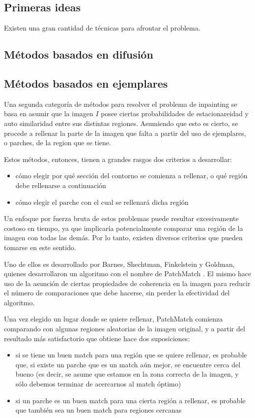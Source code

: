 \documentclass[assd_tpf_main.tex]{subfiles}
\begin{document}
\subsection{Primeras ideas}
Existen una gran cantidad de técnicas para afrontar el problema.


\subsection{Métodos basados en difusión}





\subsection{Métodos basados en ejemplares}
Una segunda categor\'ia de m\'etodos para resolver el problema de inpainting se basa en 
asumir que la imagen $I$ posee ciertas probabilidades de estacionareidad y auto similaridad 
entre sus distintas regiones. Asumiendo que esto es cierto, se procede a rellenar la parte
de la imagen que falta a partir del uso de ejemplares, o parches, de la region que se tiene.

Estos m\'etodos, entonces, tienen a grandes rasgos dos criterios a desarrollar:
\begin{itemize}
	\item c\'omo elegir por qu\'e secci\'on del contorno se comienza a rellenar, o qu\'e
	regi\'on debe rellenarse a continuaci\'on
	\item c\'omo elegir el parche con el cual se rellenar\'a dicha regi\'on
\end{itemize}

Un enfoque por fuerza bruta de estos problemas puede resultar excesivamente costoso en tiempo, ya que implicar\'ia potencialmente comparar una regi\'on de la imagen con todas las dem\'as. Por lo tanto, existen diversos criterios que pueden tomarse en este sentido.

Uno de ellos es desarrollado por Barnes, Shechtman, Finkelstein y Goldman, quienes desarrollaron un algoritmo con el nombre de PatchMatch \cite{patchmatch}.  El mismo
hace uso de la asunci\'on de ciertas propiedades de coherencia en la imagen para reducir
el n\'umero de comparaciones que debe hacerse, sin perder la efectividad del algoritmo.
 
Una vez elegido un lugar donde se quiere rellenar, PatchMatch comienza comparando con algunas regiones aleatorias de la imagen original, y a partir del resultado m\'as satisfactorio que obtiene hace dos suposiciones:
\begin{itemize}
	\item si se tiene un buen match para una regi\'on que se quiere rellenar, es probable 
	que, si existe un parche que es un match a\'un mejor, se encuentre cerca del bueno (es
	decir, se asume que estamos en la zona correcta de la imagen, y s\'olo debemos
	terminar de acercarnos al match \'optimo)
	\item si un parche es un buen match para una cierta regi\'on a rellenar, es probable que
	tambi\'en sea un buen match para regiones cercanas
\end{itemize}
\end{document}
